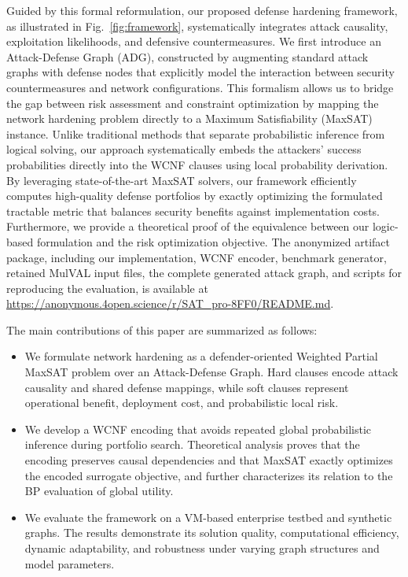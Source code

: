 \documentclass[conference]{IEEEtran}
\theoremstyle{definition} %
\theoremstyle{plain} %
\begin{document}
Guided by this formal reformulation, our proposed defense hardening framework, as illustrated in Fig.~\ref{fig:framework}, systematically integrates attack causality, exploitation likelihoods, and defensive countermeasures. We first introduce an Attack-Defense Graph (ADG), constructed by augmenting standard attack graphs with defense nodes that explicitly model the interaction between security countermeasures and network configurations. This formalism allows us to bridge the gap between risk assessment and constraint optimization by mapping the network hardening problem directly to a Maximum Satisfiability (MaxSAT) instance. Unlike traditional methods that separate probabilistic inference from logical solving, our approach systematically embeds the attackers' success probabilities directly into the WCNF clauses using local probability derivation. By leveraging state-of-the-art MaxSAT solvers, our framework efficiently computes high-quality defense portfolios by exactly optimizing the formulated tractable metric that balances security benefits against implementation costs. Furthermore, we provide a theoretical proof of the equivalence between our logic-based formulation and the risk optimization objective. The anonymized artifact package, including our implementation, WCNF encoder, benchmark generator, retained MulVAL input files, the complete generated attack graph, and scripts for reproducing the evaluation, is available at \url{https://anonymous.4open.science/r/SAT_pro-8FF0/README.md}.

The main contributions of this paper are summarized as follows:

{\color{red}
\begin{itemize}
    \item[i)] We formulate network hardening as a defender-oriented Weighted Partial MaxSAT problem over an Attack-Defense Graph. Hard clauses encode attack causality and shared defense mappings, while soft clauses represent operational benefit, deployment cost, and probabilistic local risk.

    \item[ii)] We develop a WCNF encoding that avoids repeated global probabilistic inference during portfolio search. Theoretical analysis proves that the encoding preserves causal dependencies and that MaxSAT exactly optimizes the encoded surrogate objective, and further characterizes its relation to the BP evaluation of global utility.
    
    \item[iii)] We evaluate the framework on a VM-based enterprise testbed and synthetic graphs. The results demonstrate its solution quality, computational efficiency, dynamic adaptability, and robustness under varying graph structures and model parameters.
\end{itemize}
}
\end{document}
